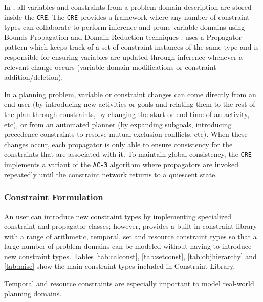 In \eue, all variables and constraints from a problem domain
description are stored inside the \texttt{CRE}.  The \texttt{CRE}
provides a framework where any number of constraint types can
collaborate to perform inference and prune variable domains using
Bounds Propagation and Domain Reduction techniques \cite{marriott98}. 
\eu uses a Propagator pattern which keeps track of a set of
constraint instances of the same type and is responsible for ensuring
variables are updated through inference whenever a relevant change occurs
 (variable domain modifications or constraint addition/deletion).

In a planning problem, variable or constraint changes can come
directly from an end user (by introducing new activities or goals and
relating them to the rest of the plan through constraints, by changing
the start or end time of an activity, etc), or from an automated planner (by
expanding subgoals, introducing precedence constraints to resolve
mutual exclusion conflicts, etc). When these changes occur, each
propagator is only able to ensure consistency for the constraints that
are associated with it.  To maintain global consistency, the
\texttt{CRE} implements a variant of the \texttt{AC-3} algorithm
\cite{mackworth77} where propagators are invoked repeatedly until
the constraint network returns to a quiescent state.

\subsubsection{Constraint Formulation}
\label{sec:europa:constraints}

An \eu user can introduce new constraint types by implementing
specialized constraint and propagator classes; however, \eu provides a
built-in constraint library with a range of arithmetic, temporal, set
and resource constraint types so that a large number of problem
domains can be modeled without having to introduce new constraint
types. Tables \ref{tab:calconst}, \ref{tab:setconst},
\ref{tab:objhierarchy} and \ref{tab:misc} show the main constraint
types included in \eus Constraint Library.



Temporal and resource constraints are especially important to model
real-world planning domains. 

